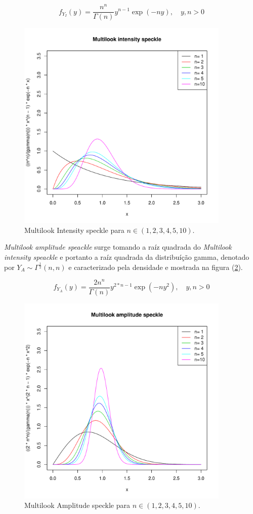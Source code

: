 \documentclass[12pt,a4paper]{article}
\begin{document}
\begin{equation}\label{eqn102}
	f_{Y_{I}}(y)=\frac{n^{n}}{\Gamma(n)}y^{n-1}\exp\left(-ny\right),\quad y,n>0 
\end{equation}

\begin{figure}[!htb]
\centering
\includegraphics[width=4.0in]{fig_eq_fyi_frery_muller_1997.pdf}
	\caption{Multilook Intensity speckle  para $n\in(1,2,3,4,5,10)$.}
\label{fig9}
\end{figure}

{\it Multilook amplitude speackle} surge tomando a raíz quadrada do {\it Multilook intensity speackle} e portanto a raíz quadrada da distribuíção gamma, denotado por $Y_{A}\sim \Gamma^{\frac{1}{2}}(n,n)$ e caracterizado pela densidade e mostrada na figura  (\ref{fig10}).

\begin{equation}\label{eqn103}
	f_{Y_{A}}(y)=\frac{2n^{n}}{\Gamma(n)}y^{2*n-1}\exp\left(-ny^2\right),\quad y,n>0 
\end{equation}
\begin{figure}[!htb]
\centering
\includegraphics[width=4.0in]{fig_eq_fya_frery_muller_1997.pdf}
	\caption{Multilook Amplitude speckle  para $n\in(1,2,3,4,5,10)$.}
\label{fig10}
\end{figure}
\end{document}
